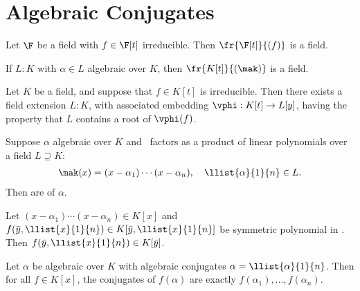 \documentclass[a4paper]{article}
\begin{document}
\section{Algebraic Conjugates}

\begin{tlemma}
  Let \( \F \) be a field with \( f\in \F[t] \) irreducible.
  Then \( \fr{\F[t]}{(f)} \) is a field.
\end{tlemma}

\begin{tcorollary}
  If \( L:K \) with \( \alpha\in L \) algebraic over \( K \), then \( \fr{K[t]}{(\mak)} \) is a field.
\end{tcorollary}

\begin{ttheorem}
  Let \( K \) be a field, and suppose that \( f\in K[t] \) is irreducible.
  Then there exists a field extension \( L:K \), with associated embedding \( \vphi:K[t]\to L[y] \), having the property that \( L \) contains a root of \( \vphi(f) \).
\end{ttheorem}

\begin{tdefinition}
  Suppose \( \alpha \) algebraic over \( K \) and \mak~factors as a product of linear polynomials over a field \( L\supseteq K \): \begin{align*}
    \mak(x) = (x-\alpha_1)\cdots(x-\alpha_n),\quad \llist{\alpha}{1}{n}\in L.
  \end{align*}
  Then  are  of \( \alpha \).
\end{tdefinition}

\begin{tlemma}
  Let \( (x-\alpha_1)\cdots(x-\alpha_n)\in K[x] \) and \( f(\bar y,\llist{x}{1}{n})\in K[\bar y,\llist{x}{1}{n}] \) be symmetric polynomial in .
  Then \( f(\bar y,\llist{x}{1}{n}) \in K[\bar y] \).
\end{tlemma}

\begin{ttheorem}
  Let \( \alpha \) be algebraic over \( K \) with algebraic conjugates \( \alpha=\llist{\alpha}{1}{n} \).
  Then for all \( f\in K[x] \), the conjugates of \( f(\alpha) \) are exactly \( f(\alpha_1),\ldots,f(\alpha_n) \).
\end{ttheorem}
\end{document}
